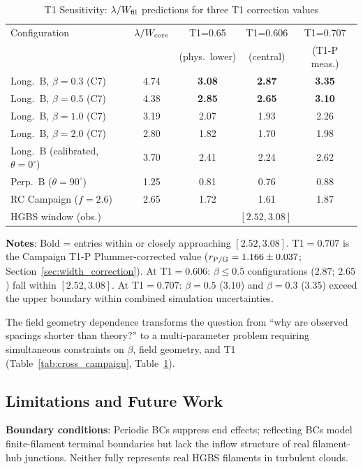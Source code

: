 \documentclass[twoside,twocolumn]{mnras}
\begin{document}
\begin{table}
\caption{T1 Sensitivity: $\lambda/W_{\rm fil}$ predictions for three T1 correction values}
\label{tab:t1_budget}
\small
\begin{tabular}{lcccc}
\toprule
Configuration & $\lambda/W_{\rm core}$ & T1=0.65 & T1=0.606 & T1=0.707 \\
              &                       & (phys.\ lower) & (central) & (T1-P meas.) \\
\midrule
Long.\ B, $\beta=0.3$ (C7) & 4.74 & \textbf{3.08} & \textbf{2.87} & \textbf{3.35} \\
Long.\ B, $\beta=0.5$ (C7) & 4.38 & \textbf{2.85} & \textbf{2.65} & \textbf{3.10} \\
Long.\ B, $\beta=1.0$ (C7) & 3.19 & 2.07 & 1.93 & 2.26 \\
Long.\ B, $\beta=2.0$ (C7) & 2.80 & 1.82 & 1.70 & 1.98 \\
Long.\ B (calibrated, $\theta=0^\circ$) & 3.70 & 2.41 & 2.24 & 2.62 \\
Perp.\ B ($\theta=90^\circ$) & 1.25 & 0.81 & 0.76 & 0.88 \\
RC Campaign ($f=2.6$) & 2.65 & 1.72 & 1.61 & 1.87 \\
\midrule
\multicolumn{2}{l}{HGBS window (obs.)} & \multicolumn{3}{c}{$[2.52, 3.08]$} \\
\bottomrule
\end{tabular}
\vspace{2pt}
\footnotesize
\textbf{Notes}: Bold = entries within or closely approaching $[2.52, 3.08]$. T1$=0.707$ is the Campaign T1-P Plummer-corrected value ($r_{\rm P/G} = 1.166 \pm 0.037$; Section~\ref{sec:width_correction}). At T1$=0.606$: $\beta \leq 0.5$ configurations ($2.87$; $2.65$) fall within $[2.52, 3.08]$. At T1$=0.707$: $\beta=0.5$ ($3.10$) and $\beta=0.3$ ($3.35$) exceed the upper boundary within combined simulation uncertainties.
\end{table}

The field geometry dependence transforms the question from ``why are observed spacings
shorter than theory?'' to a multi-parameter problem requiring simultaneous constraints
on $\beta$, field geometry, and T1 (Table~\ref{tab:cross_campaign}, Table~\ref{tab:t1_budget}).

\subsection{Limitations and Future Work}

\textbf{Boundary conditions}: Periodic BCs suppress end effects; reflecting BCs model
finite-filament terminal boundaries but lack the inflow structure of real filament-hub
junctions. Neither fully represents real HGBS filaments in turbulent clouds.
\end{document}
